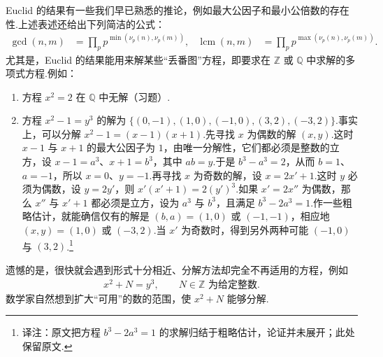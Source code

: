 Euclid 的结果有一些我们早已熟悉的推论，例如最大公因子和最小公倍数的存在性.上述表述还给出下列简洁的公式：
\begin{align*}
\operatorname{gcd}(n,m)&=\prod_p p^{\min(\nu_p(n),\nu_p(m))},&
\operatorname{lcm}(n,m)&=\prod_p p^{\max(\nu_p(n),\nu_p(m))}.
\end{align*}
尤其是，Euclid 的结果能用来解某些``丢番图''方程，即要求在 $\mathbb Z$ 或 $\mathbb Q$ 中求解的多项式方程.例如：
\begin{enumerate}
\item 方程 $x^2=2$ 在 $\mathbb Q$ 中无解（习题）.
\item 方程 $x^2-1=y^3$ 的解为 $\{(0,-1),(1,0),(-1,0),(3,2),(-3,2)\}$.事实上，可以分解 $x^2-1=(x-1)(x+1)$.先寻找 $x$ 为偶数的解 $(x,y)$.这时 $x-1$ 与 $x+1$ 的最大公因子为 $1$，由唯一分解性，它们都必须是整数的立方，设 $x-1=a^3$、$x+1=b^3$，其中 $ab=y$.于是 $b^3-a^3=2$，从而 $b=1$、$a=-1$，所以 $x=0$、$y=-1$.再寻找 $x$ 为奇数的解，设 $x=2x'+1$.这时 $y$ 必须为偶数，设 $y=2y'$，则 $x'(x'+1)=2(y')^3$.如果 $x'=2x''$ 为偶数，那么 $x''$ 与 $x'+1$ 都必须是立方，设为 $a^3$ 与 $b^3$，且满足 $b^3-2a^3=1$.作一些粗略估计，就能确信仅有的解是 $(b,a)=(1,0)$ 或 $(-1,-1)$，相应地 $(x,y)=(1,0)$ 或 $(-3,2)$.当 $x'$ 为奇数时，得到另外两种可能 $(-1,0)$ 与 $(3,2)$.\footnote{译注：原文把方程 $b^3-2a^3=1$ 的求解归结于粗略估计，论证并未展开；此处保留原文.}
\end{enumerate}
遗憾的是，很快就会遇到形式十分相近、分解方法却完全不再适用的方程，例如
\begin{align*}
x^2+N=y^3,\qquad N\in\mathbb Z\text{ 为给定整数}.
\end{align*}
数学家自然想到扩大``可用''的数的范围，使 $x^2+N$ 能够分解.

